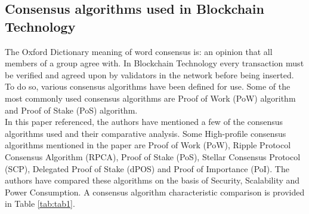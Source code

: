 \documentclass{IEEEtran}
\begin{document}
    \subsection{Consensus algorithms used in Blockchain Technology \cite{8400278}}
      The Oxford Dictionary meaning of word consensus is: an opinion that all members of a group agree with. In Blockchain Technology every transaction must be verified and agreed upon by validators in the network before being inserted. To do so, various consensus algorithms have been defined for use. Some of the most commonly used consensus algorithms are Proof of Work (PoW) algorithm and Proof of Stake (PoS) algorithm.\\
      In this paper referenced, the authors have mentioned a few of the consensus algorithms used and their comparative analysis. Some High-profile consensus algorithms mentioned in the paper are Proof of Work (PoW), Ripple Protocol Consensus Algorithm (RPCA), Proof of Stake (PoS), Stellar Consensus Protocol (SCP), Delegated Proof of Stake (dPOS) and Proof of Importance (PoI). The authors have compared these algorithms on the basis of Security, Scalability and Power Consumption. A consensus algorithm characteristic comparison is provided in Table \ref{tab:tab1}.
\end{document}
